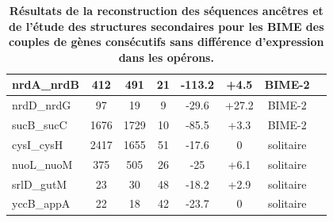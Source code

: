 \documentclass[12pt,a4paper]{report}
\begin{document}
\begin{table}[h!]
{\begin{tabular}{|l|c|c|c|c|c|c|c|}
  \hline
  nrdA\_nrdB & 412 & 491 & 21 & -113.2 & +4.5 & BIME-2\\
  \hline
  nrdD\_nrdG & 97 & 19 & 9 & -29.6 & +27.2 & BIME-2\\
  \hline  
  sucB\_sucC & 1676 & 1729 & 10 & -85.5 & +3.3 & BIME-2\\
  \hline
  cysI\_cysH & 2417 & 1655 & 51 & -17.6 & 0 & solitaire\\
  \hline  
  nuoL\_nuoM & 375 & 505 & 26 & -25 & +6.1 & solitaire\\
  \hline
  srlD\_gutM & 23 & 30 & 48 & -18.2 & +2.9 & solitaire\\
  \hline
  yccB\_appA & 22 & 18 & 42 & -23.7 & 0 & solitaire\\
  \hline
\end{tabular}
}
\caption{\textbf{Résultats de la reconstruction des séquences ancêtres et de l'étude des structures secondaires pour les BIME des couples de gènes consécutifs sans différence d'expression dans les opérons.} }
\end{table}
\end{document}
